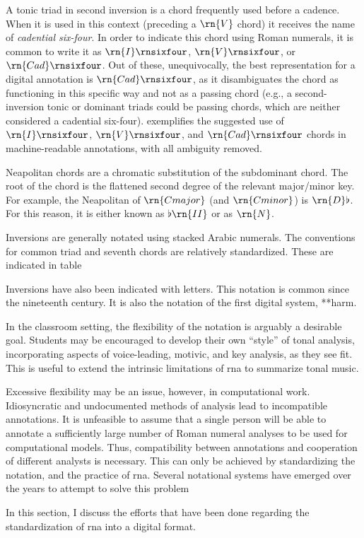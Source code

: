 A tonic triad in second inversion is a chord frequently used
before a cadence. When it is used in this context (preceding
a $\rn{V}$ chord) it receives the name of \emph{cadential
six-four}. In order to indicate this chord using Roman
numerals, it is common to write it as $\rn{I}\rnsixfour$,
$\rn{V}\rnsixfour$, or $\rn{Cad}\rnsixfour$. Out of these,
unequivocally, the best representation for a digital
annotation is $\rn{Cad}\rnsixfour$, as it disambiguates the
chord as functioning in this specific way and not as a
passing chord (e.g., a second-inversion tonic or dominant
triads could be passing chords, which are neither considered
a cadential six-four). 
exemplifies the suggested use of $\rn{I}\rnsixfour$,
$\rn{V}\rnsixfour$, and $\rn{Cad}\rnsixfour$ chords in
machine-readable annotations, with all ambiguity removed.

Neapolitan chords are a chromatic substitution of the
subdominant chord. The root of the chord is the flattened
second degree of the relevant major/minor key. For example,
the Neapolitan of $\rn{C major}$ (and $\rn{C minor}$) is
$\rn{D}\flat$. For this reason, it is either known as
$\flat\rn{II}$ or as $\rn{N}$.

Inversions are generally notated using stacked Arabic
numerals. The conventions for common triad and seventh
chords are relatively standardized. These are indicated in
table 


Inversions have also been indicated with letters. This
notation is common since the nineteenth century. It is also
the notation of the first digital system, **harm.

In the classroom setting, the flexibility of the notation is
arguably a desirable goal. Students may be encouraged to
develop their own ``style'' of tonal analysis, incorporating
aspects of voice-leading, motivic, and key analysis, as they
see fit. This is useful to extend the intrinsic limitations
of \gls{rna} to summarize tonal music.

Excessive flexibility may be an issue, however, in
computational work. Idiosyncratic and undocumented methods
of analysis lead to incompatible annotations. It is
unfeasible to assume that a single person will be able to
annotate a sufficiently large number of Roman numeral
analyses to be used for computational models. Thus,
compatibility between annotations and cooperation of
different analysts is necessary. This can only be achieved
by standardizing the notation, and the practice of
\gls{rna}. Several notational systems have emerged over the
years to attempt to solve this problem

In this section, I discuss the efforts that have been done
regarding the standardization of \gls{rna} into a digital
format.

